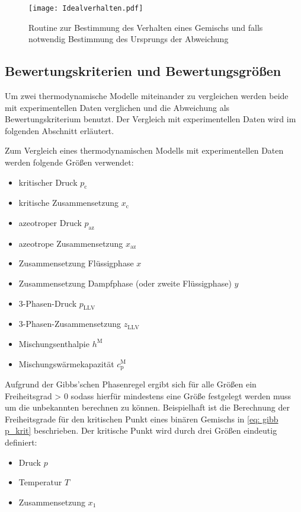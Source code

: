 \documentclass[../thesis.tex]{subfiles}
\begin{document}
\begin{figure}[htbp]
	\centering
	\texttt{[image: Idealverhalten.pdf]}
	\caption{Routine zur Bestimmung des Verhalten eines Gemischs und falls notwendig Bestimmung des Ursprungs der Abweichung}
	\label{fig: klassifikation}
\end{figure}

\subsection{Bewertungskriterien und Bewertungsgrößen}

Um zwei thermodynamische Modelle miteinander zu vergleichen werden beide mit experimentellen Daten verglichen und die Abweichung als Bewertungskriterium benutzt. Der Vergleich mit experimentellen Daten wird im folgenden Abschnitt erläutert.

Zum Vergleich eines thermodynamischen Modells mit experimentellen Daten werden folgende Größen verwendet:
\begin{itemize}
	\item kritischer Druck $ p_\mathrm{c} $
	\item kritische Zusammensetzung $ x_\mathrm{c} $
	\item azeotroper Druck $ p_\mathrm{az} $
	\item azeotrope Zusammensetzung $ x_\mathrm{az} $
	\item Zusammensetzung Flüssigphase $ x $
	\item Zusammensetzung Dampfphase (oder zweite Flüssigphase) $ y $
	\item 3-Phasen-Druck $p_{\mathrm{LLV}}$
	\item 3-Phasen-Zusammensetzung $z_{\mathrm{LLV}}$
	\item Mischungsenthalpie $h^{\mathrm{M}}$
	\item Mischungswärmekapazität $c_{\mathrm{p}}^{\mathrm{M}}$
\end{itemize}

Aufgrund der Gibbs'schen Phasenregel ergibt sich für alle Größen ein Freiheitsgrad > 0 sodass hierfür mindestens eine Größe festgelegt werden muss um die unbekannten berechnen zu können. Beispielhaft ist die Berechnung der Freiheitsgrade für den kritischen Punkt eines binären Gemischs in \autoref{eq: gibb p_krit} beschrieben.
Der kritische Punkt wird durch drei Größen eindeutig definiert:
\begin{itemize}
	\item Druck $p$
	\item Temperatur $T$
	\item Zusammensetzung $x_1$
\end{itemize}
\end{document}
